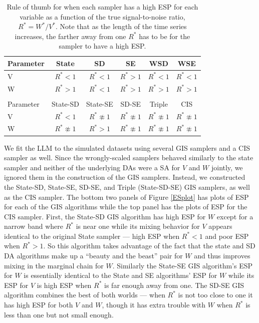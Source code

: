\documentclass[12pt]{article}
\begin{document}
\begin{table}
  \centering
  \begin{tabular}{lccccc}\hline
    Parameter & State & SD & SE & WSD & WSE \\\hline
    V & $R^* < 1$ & $R^* < 1$ & $R^* > 1$ & $R^* < 1$ & $R^* < 1$\\
    W & $R^* > 1$ & $R^* < 1$ & $R^* > 1$ & $R^* > 1$ & $R^* > 1$ \\
      &           &          &           &           &           \\\hline
    Parameter & State-SD        & State-SE       & SD-SE        & Triple            & CIS \\\hline
    V         & $R^* < 1$           & $R^* \not\approx 1$ & $R^* \not\approx 1$ & $R^* \not\approx 1$ & $R^* \not\approx 1$ \\
    W         & $R^* \not\approx 1$ & $R^* > 1$           & $R^* \not\approx 1$ & $R^* \not\approx 1$ & $R^* \not\approx 1$\\\hline
  \end{tabular}
  \caption{Rule of thumb for when each sampler has a high ESP for each variable as a function of the true signal-to-noise ratio, $R^*=W^*/V^*$. Note that as the length of the time series increases, the farther away from one $R^*$ has to be for the sampler to have a high ESP.}
  \label{tab:stnmix}
\end{table}

We fit the LLM to the simulated datasets using several GIS samplers and a CIS sampler as well. Since the wrongly-scaled samplers behaved similarly to the state sampler and neither of the underlying DAs were a SA for $V$ and $W$ jointly, we ignored them in the construction of the GIS samplers. Instead, we constructed the State-SD, State-SE, SD-SE, and Triple (State-SD-SE) GIS samplers, as well as the CIS sampler. The bottom two panels of Figure \ref{ESplot} has plots of ESP for each of the GIS algorithms while the top panel has the plots of ESP for the CIS sampler. First, the State-SD GIS algorithm has high ESP for $W$ except for a narrow band where $R^*$ is near one while its mixing behavior for $V$ appears identical to the original State sampler --- high ESP when $R^* < 1$ and poor ESP when $R^* > 1$. So this algorithm takes advantage of the fact that the state and SD DA algorithms make up a ``beauty and the beast'' pair for $W$ and thus improves mixing in the marginal chain for $W$. Similarly the State-SE GIS algorithm's ESP for $W$ is essentially identical to the State and SE algorithms' ESP for $W$ while its ESP for $V$ is high ESP when $R^*$ is far enough away from one. The SD-SE GIS algorithm combines the best of both worlds --- when $R^*$ is not too close to one it has high ESP for both $V$ and $W$, though it has extra trouble with $W$ when $R^*$ is less than one but not small enough. 
\end{document}
